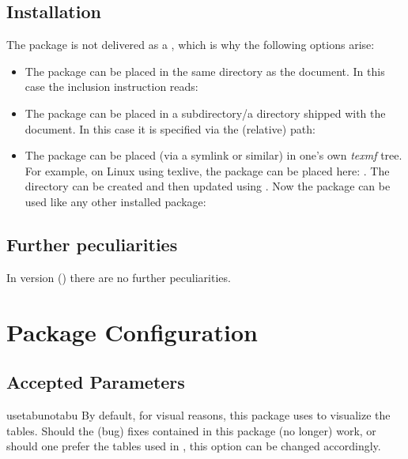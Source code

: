 \documentclass{sopra-base}
\begin{document}
\subsection{Installation}
    The package is not delivered as a , which is why the
    following options arise:
    \begin{itemize}
        \item The package can be placed in the same directory as the
                document. In this case the inclusion instruction reads:
\begin{plainlatex}
\usepackage{sopra-requirements}
\end{plainlatex}
        \item The package can be placed in a subdirectory/a directory
                shipped with the document. In this case it is specified
                via the (relative) path:
\begin{plainlatex}
\usepackage{./My/Path/to/sopra-requirements}
\end{plainlatex}
        \item The package can be placed (via a symlink or similar)
              in one's own \emph{texmf} tree.
              For example, on Linux using texlive,
              the package can be placed here: .
              The directory can be created and then updated using
              . Now
              the package can be used like any other installed package:
\begin{plainlatex}
\usepackage{sopra-requirements}
\end{plainlatex}
    \end{itemize}

\subsection{Further peculiarities}
In version \thesorversion{} () there are no further
peculiarities.

\section{Package Configuration}
    \subsection{Accepted Parameters}

\begin{argument}{usetabu}{notabu}
    By default, for visual reasons, this package uses  to visualize the tables. Should the (bug) fixes contained in this package (no longer) work, or should one prefer the  tables used in , this option can be changed accordingly.
\end{argument}
\end{document}
